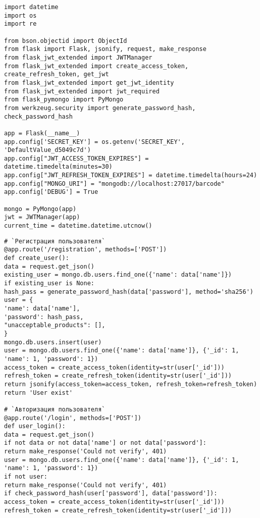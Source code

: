 \vspace*{\fill}
\vspace*{\fill}

\clearpage

\vspace{\baselineskip}

\begin{lstlisting}
import datetime
import os
import re

from bson.objectid import ObjectId
from flask import Flask, jsonify, request, make_response
from flask_jwt_extended import JWTManager
from flask_jwt_extended import create_access_token, create_refresh_token, get_jwt
from flask_jwt_extended import get_jwt_identity
from flask_jwt_extended import jwt_required
from flask_pymongo import PyMongo
from werkzeug.security import generate_password_hash, check_password_hash

app = Flask(__name__)
app.config['SECRET_KEY'] = os.getenv('SECRET_KEY', 'DefaultValue_d5049c7d')
app.config["JWT_ACCESS_TOKEN_EXPIRES"] = datetime.timedelta(minutes=30)
app.config["JWT_REFRESH_TOKEN_EXPIRES"] = datetime.timedelta(hours=24)
app.config["MONGO_URI"] = "mongodb://localhost:27017/barcode"
app.config['DEBUG'] = True

mongo = PyMongo(app)
jwt = JWTManager(app)
current_time = datetime.datetime.utcnow()
\end{lstlisting}
\clearpage
{}
\begin{lstlisting}
# `Регистрация пользователя`
@app.route('/registration', methods=['POST'])
def create_user():
data = request.get_json()
existing_user = mongo.db.users.find_one({'name': data['name']})
if existing_user is None:
hash_pass = generate_password_hash(data['password'], method='sha256')
user = {
'name': data['name'],
'password': hash_pass,
"unacceptable_products": [],
}
mongo.db.users.insert(user)
user = mongo.db.users.find_one({'name': data['name']}, {'_id': 1, 'name': 1, 'password': 1})
access_token = create_access_token(identity=str(user['_id']))
refresh_token = create_refresh_token(identity=str(user['_id']))
return jsonify(access_token=access_token, refresh_token=refresh_token)
return 'User exist'

# `Авторизация пользователя`
@app.route('/login', methods=['POST'])
def user_login():
data = request.get_json()
if not data or not data['name'] or not data['password']:
return make_response('Could not verify', 401)
user = mongo.db.users.find_one({'name': data['name']}, {'_id': 1, 'name': 1, 'password': 1})
if not user:
return make_response('Could not verify', 401)
if check_password_hash(user['password'], data['password']):
access_token = create_access_token(identity=str(user['_id']))
refresh_token = create_refresh_token(identity=str(user['_id']))
\end{lstlisting}
